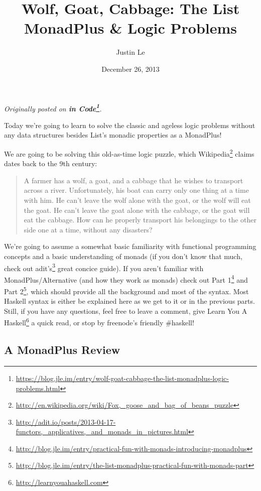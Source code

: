 \documentclass[]{article}
\title{Wolf, Goat, Cabbage: The List MonadPlus \& Logic Problems}
\author{Justin Le}
\date{December 26, 2013}
\renewcommand{\href}[2]{#2\footnote{\url{#1}}}
\begin{document}
\maketitle

\emph{Originally posted on
\textbf{\href{https://blog.jle.im/entry/wolf-goat-cabbage-the-list-monadplus-logic-problems.html}{in
Code}}.}

Today we're going to learn to solve the classic and ageless logic problems
without any data structures besides List's monadic properties as a MonadPlus!

We are going to be solving this old-as-time logic puzzle, which
\href{http://en.wikipedia.org/wiki/Fox,_goose_and_bag_of_beans_puzzle}{Wikipedia}
claims dates back to the 9th century:

\begin{quote}
A farmer has a wolf, a goat, and a cabbage that he wishes to transport across a
river. Unfortunately, his boat can carry only one thing at a time with him. He
can't leave the wolf alone with the goat, or the wolf will eat the goat. He
can't leave the goat alone with the cabbage, or the goat will eat the cabbage.
How can he properly transport his belongings to the other side one at a time,
without any disasters?
\end{quote}

We're going to assume a somewhat basic familiarity with functional programming
concepts and a basic understanding of monads (if you don't know that much, check
out
\href{http://adit.io/posts/2013-04-17-functors,_applicatives,_and_monads_in_pictures.html}{adit's}
great concice guide). If you aren't familiar with MonadPlus/Alternative (and how
they work as monads) check out
\href{http://blog.jle.im/entry/practical-fun-with-monads-introducing-monadplus}{Part
1} and
\href{http://blog.jle.im/entry/the-list-monadplus-practical-fun-with-monads-part}{Part
2}, which should provide all the background and most of the syntax. Most Haskell
syntax is either be explained here as we get to it or in the previous parts.
Still, if you have any questions, feel free to leave a comment, give
\href{http://learnyouahaskell.com}{Learn You A Haskell} a quick read, or stop by
freenode's friendly \#haskell!

\hypertarget{a-monadplus-review}{%
\subsection{A MonadPlus Review}\label{a-monadplus-review}}
\end{document}
